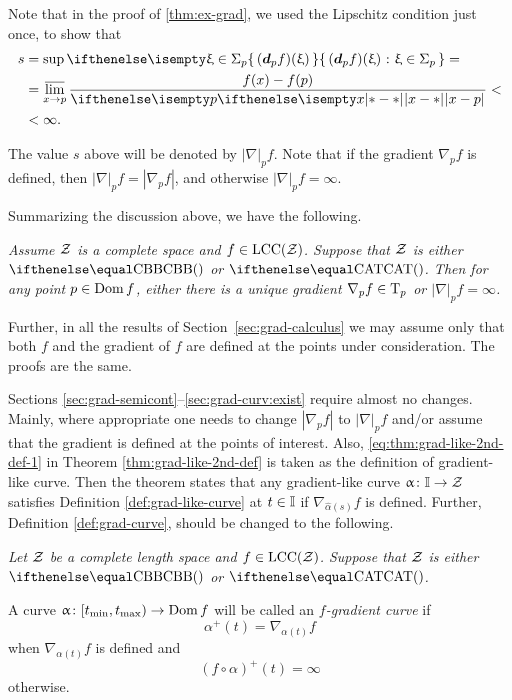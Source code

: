 Note that in the proof of \ref{thm:ex-grad}, 
we used the Lipschitz condition just once,
to show that 
\begin{align*}
s&=\sup\set{(\dd_p f)(\xi)}{\xi\in\Sigma_p}=
\\
&=\limsup_{x\to p}\frac{f(x)-f(p)}{\dist{x}{p}{}}<
\\
&<\infty.
\end{align*}


The value $s$ above will be denoted by $|\nabla|_pf$.
Note that if the gradient $\nabla_pf$ is defined, then $|\nabla|_pf=|\nabla_pf|$,
and otherwise $|\nabla|_pf=\infty$.

Summarizing the discussion above, 
we have the following.

\textit{Assume $\mathcal{Z}$ is a complete space and $f\in \LSCSC(\spc{Z})$. 
Suppose that $\mathcal{Z}$ is either $\Alex{}$ or $\CAT{}$.
Then for any point $p\in \Dom f$, either there is a unique gradient $\nabla_p f\in \T_p$ 
or $|\nabla|_pf=\infty$.}

\medskip

Further, in all the results of Section~\ref{sec:grad-calculus} 
we may assume only that both $f$ and the gradient of $f$ are defined at the points under consideration. The proofs are the same.

Sections \ref{sec:grad-semicont}--\ref{sec:grad-curv:exist}
require almost no changes.
Mainly, where appropriate
one needs to change $|\nabla_p f|$ 
to $|\nabla|_pf$ 
and/or assume that the gradient is defined at the points of interest.
Also,  \ref{eq:thm:grad-like-2nd-def-1} in Theorem \ref{thm:grad-like-2nd-def}
is taken as the definition of gradient-like curve.
Then the theorem states that any  gradient-like curve $\alpha\:\II\to\spc{Z}$ satisfies Definition \ref{def:grad-like-curve} at $t\in \II$ if $\nabla_{\hat\alpha(s)} f$ is defined.
Further, Definition \ref{def:grad-curve}, should be changed to the following.

\medskip

{\it Let $\mathcal{Z}$ be a complete length space
and $f\in\LSCSC(\spc{Z})$.
Suppose that $\mathcal{Z}$ is either $\Alex{}$ or $\CAT{}$.

A curve 
$\alpha\:[t_{\min},t_{\max})\to\Dom f$ will be called an  \emph{$f$-gradient curve} if
\[\alpha^+(t)=\nabla_{\alpha(t)} f\]
when $\nabla_{\alpha(t)} f$ is defined and 
\[(f\circ\alpha)^+(t)=\infty\]
otherwise.}

